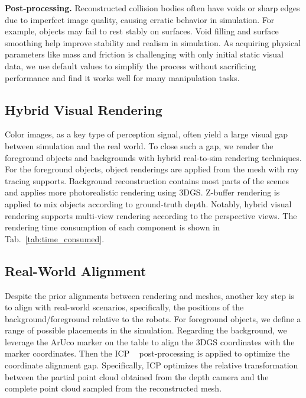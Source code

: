 \noindent\textbf{Post-processing.}
Reconstructed collision bodies often have voids or sharp edges due to imperfect image quality, causing erratic behavior in simulation. For example, objects may fail to rest stably on surfaces.
Void filling and surface smoothing help improve stability and realism in simulation. 
As acquiring physical parameters like mass and friction is challenging with only initial static visual data, we use default values to simplify the process without sacrificing performance and find it works well for many manipulation tasks.

\subsection{Hybrid Visual Rendering}
\label{sec:method:rendering}
Color images, as a key type of perception signal, often yield a large visual gap between simulation and the real world.
To close such a gap, we render the foreground objects and backgrounds with hybrid real-to-sim rendering techniques.
For the foreground objects, object renderings are applied from the mesh with ray tracing supports. Background reconstruction contains most parts of the scenes and applies more photorealistic rendering using 3DGS. Z-buffer rendering is applied to mix objects according to ground-truth depth. Notably, hybrid visual rendering supports multi-view rendering according to the perspective views. The rendering time consumption of each component is shown in Tab.~\ref{tab:time_consumed}.


\subsection{Real-World Alignment}
\label{sec:method:alignment}
Despite the prior alignments between rendering and meshes, another key step is to align with real-world scenarios, specifically, the positions of the background/foreground relative to the robots. For foreground objects, we define a range of possible placements in the simulation. Regarding the background, we leverage the ArUco marker on the table to align the 3DGS coordinates with the marker coordinates. Then the ICP ~\citep{schenker1992sensor,censi2008icp,low2004linear} post-processing is applied to optimize the coordinate alignment gap. Specifically, ICP optimizes the relative transformation between the partial point cloud obtained from the depth camera and the complete point cloud sampled from the reconstructed mesh.

